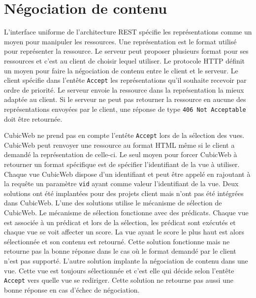 \section{Négociation de contenu} 
L'interface uniforme de l'architecture REST spécifie les représentations comme un moyen pour manipuler les ressources. Une représentation est le format utilisé pour représenter la ressource. Le serveur peut proposer plusieurs format pour ses ressources et c'est au client de choisir lequel utiliser. Le protocole HTTP définit un moyen pour faire la négociation de contenu entre le client et le serveur. Le client spécifie dans l'entête \texttt{Accept} les représentations qu'il souhaite recevoir par ordre de priorité. Le serveur envoie la ressource dans la représentation la mieux adaptée au client. Si le serveur ne peut pas retourner la ressource en aucune des représentations envoyées par le client, une réponse de type \texttt{406~Not~Acceptable} doit être retournée.

CubicWeb ne prend pas en compte l'entête \texttt{Accept} lors de la sélection des vues. CubicWeb peut renvoyer une ressource au format HTML même si le client a demandé la représentation  de celle-ci. Le seul moyen pour forcer CubicWeb à retourner un format spécifique est de spécifier l'identifiant de la vue à utiliser. Chaque vue CubicWeb dispose d'un identifiant et peut être appelé en rajoutant à la requête un paramètre \texttt{vid} ayant comme valeur l'identifiant de la vue. Deux solutions ont été implantées pour des projets client mais n'ont pas été intégrées dans CubicWeb. L'une des solutions utilise le mécanisme de sélection de CubicWeb. Le mécanisme de sélection fonctionne avec des prédicats. Chaque vue est associée à un prédicat et lors de la sélection, les prédicat sont exécutés et chaque vue se voit affecter un score. La vue ayant le score le plus haut est alors sélectionnée et son contenu est retourné. Cette solution fonctionne mais ne retourne pas la bonne réponse dans le cas où le format demandé par le client n'est pas supporté. L'autre solution implante la négociation de contenu dans une vue. Cette vue est toujours sélectionnée et c'est elle qui décide selon l'entête \texttt{Accept} vers quelle vue se rediriger. Cette solution ne retourne pas aussi une bonne réponse en cas d'échec de négociation.

